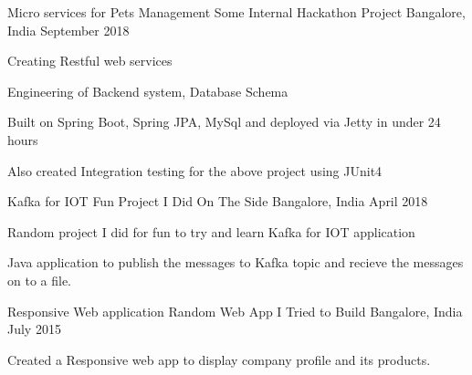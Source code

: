 \begin{cventries}
  \cventry
    {Micro services for Pets Management}
    {Some Internal Hackathon Project}
    {Bangalore, India}
    {September 2018}
    {
      \begin{cvitems}
        \item {Creating Restful web services}
        \item {Engineering of Backend system, Database Schema}
        \item {Built on Spring Boot, Spring JPA, MySql and deployed via Jetty in under 24 hours}
        \item {Also created Integration testing for the above project using JUnit4}
      \end{cvitems}
    }
  \cventry
    {Kafka for IOT}
    {Fun Project I Did On The Side}
    {Bangalore, India}
    {April 2018}
    {
      \begin{cvitems}
        \item {Random project I did for fun to try and learn Kafka for IOT application}
        \item {Java application to publish the messages to Kafka topic and recieve the messages on to a file.}
      \end{cvitems}
    }
  \cventry
    {Responsive Web application}
    {Random Web App I Tried to Build}
    {Bangalore, India}
    {July 2015}
    {
     \begin{cvitems}
      \item {Created a Responsive web app to display company profile and its products.}
     \end{cvitems}
    }
\end{cventries}
